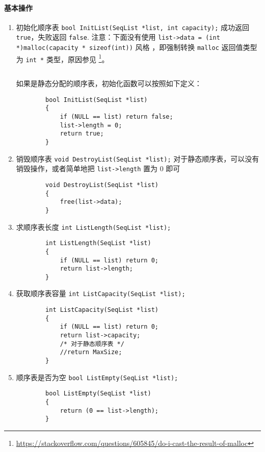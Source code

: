 \documentclass{ctexart}
\begin{document}
\paragraph{基本操作}
\begin{enumerate}
    \item 初始化顺序表 \texttt{bool InitList(SeqList *list, int capacity);} 成功返回 \texttt{true}，失败返回 \texttt{false}. 注意：下面没有使用 \texttt{list->data = (int *)malloc(capacity * sizeof(int))} 风格 ，即强制转换 \texttt{malloc} 返回值类型为 \texttt{int *} 类型，原因参见 \footnote{\url{https://stackoverflow.com/questions/605845/do-i-cast-the-result-of-malloc}}。
        \inputminted{c}{codes/init-static-list.c}
        如果是静态分配的顺序表，初始化函数可以按照如下定义：
        \begin{verbatim}
        bool InitList(SeqList *list)
        {
            if (NULL == list) return false;
            list->length = 0;
            return true;
        }
        \end{verbatim}

    \item 销毁顺序表 \texttt{void DestroyList(SeqList *list);} 对于静态顺序表，可以没有销毁操作，或者简单地把 \texttt{list->length} 置为 0 即可
        \begin{verbatim}
        void DestroyList(SeqList *list)
        {
            free(list->data);
        }
        \end{verbatim}

    \item 求顺序表长度 \texttt{int ListLength(SeqList *list);}
        \begin{verbatim}
        int ListLength(SeqList *list)
        {
            if (NULL == list) return 0;
            return list->length;
        }
        \end{verbatim}

    \item 获取顺序表容量 \texttt{int ListCapacity(SeqList *list);}
        \begin{verbatim}
        int ListCapacity(SeqList *list)
        {
            if (NULL == list) return 0;
            return list->capacity;
            /* 对于静态顺序表 */
            //return MaxSize;
        }
        \end{verbatim}

    \item 顺序表是否为空 \texttt{bool ListEmpty(SeqList *list);}
        \begin{verbatim}
        bool ListEmpty(SeqList *list)
        {
            return (0 == list->length);
        }
        \end{verbatim}


\end{enumerate}
\end{document}
